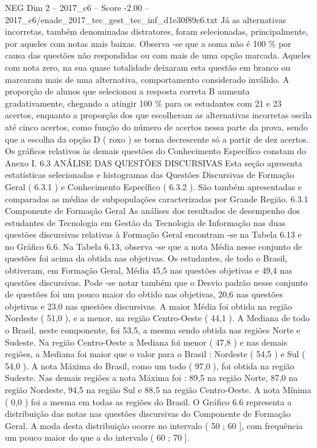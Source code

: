 \begin{textsample}{NEG Dim 2 – 2017\_c6 – Score -2.00 – 2017\_c6/enade\_2017\_tec\_gest\_tec\_inf\_d1e30f89c6.txt}
Já as alternativas incorretas, também denominadas distratores, foram selecionadas, principalmente, por aqueles com notas mais baixas.
Observa -se que a soma não é 100 \% por causa das questões não respondidas ou com mais de uma opção marcada.
Aqueles com nota zero, na sua quase totalidade deixaram esta questão em branco ou marcaram mais de uma alternativa, comportamento considerado inválido.
A proporção de alunos que selecionou a resposta correta B aumenta gradativamente, chegando a atingir 100 \% para os estudantes com 21 e 23 acertos, enquanto a proporção dos que escolheram as alternativas incorretas oscila até cinco acertos, como função do número de acertos nessa parte da prova, sendo que a escolha da opção D ( roxo ) se torna decrescente só a partir de dez acertos.
Os gráficos relativos às demais questões do Conhecimento Específico constam do Anexo I. 6.3 ANÁLISE DAS QUESTÕES DISCURSIVAS Esta seção apresenta estatísticas selecionadas e histogramas das Questões Discursivas de Formação Geral ( 6.3.1 ) e Conhecimento Específico ( 6.3.2 ).
São também apresentadas e comparadas as médias de subpopulações caracterizadas por Grande Região. 6.3.1 Componente de Formação Geral As análises dos resultados de desempenho dos estudantes de Tecnologia em Gestão da Tecnologia de Informação nas duas questões discursivas relativas à Formação Geral encontram -se na Tabela 6.13 e no Gráfico 6.6.
Na Tabela 6.13, observa -se que a nota Média nesse conjunto de questões foi acima da obtida nas objetivas.
Os estudantes, de todo o Brasil, obtiveram, em Formação Geral, Média 45,5 nas questões objetivas e 49,4 nas questões discursivas.
Pode -se notar também que o Desvio padrão nesse conjunto de questões foi um pouco maior do obtido nas objetivas, 20,6 nas questões objetivas e 23,0 nas questões discursivas.
A maior Média foi obtida na região Nordeste ( 51,0 ), e a menor, na região Centro-Oeste ( 44,1 ).
A Mediana de todo o Brasil, neste componente, foi 53,5, a mesma sendo obtida nas regiões Norte e Sudeste.
Na região Centro-Oeste a Mediana foi menor ( 47,8 ) e nas demais regiões, a Mediana foi maior que o valor para o Brasil : Nordeste ( 54,5 ) e Sul ( 54,0 ).
A nota Máxima do Brasil, como um todo ( 97,0 ), foi obtida na região Sudeste.
Nas demais regiões a nota Máxima foi : 89,5 na região Norte, 87,0 na região Nordeste, 94,5 na região Sul e 88,5 na região Centro-Oeste.
A nota Mínima ( 0,0 ) foi a mesma em todas as regiões do Brasil.
O Gráfico 6.6 representa a distribuição das notas nas questões discursivas do Componente de Formação Geral.
A moda desta distribuição ocorre no intervalo ( 50 ; 60 ], com frequência um pouco maior do que a do intervalo ( 60 ; 70 ].

\end{textsample}
